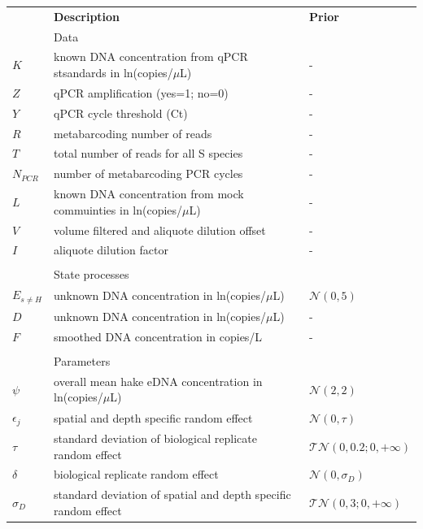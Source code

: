 \documentclass{article}
\begin{document}
\begin{table}[h]
    \centering
    \begin{tabular}{lll}
         & \textbf{Description} & \textbf{Prior} \\
&Data & \\
\hline
$K$ & known DNA concentration from qPCR stsandards in ln(copies/$\mu$L) & - \\
$Z$ & qPCR amplification (yes=1; no=0) & - \\
$Y$ & qPCR cycle threshold (Ct) & - \\
$R$ & metabarcoding number of reads & - \\
$T$ & total number of reads for all S species & - \\
$N_{PCR}$ & number of metabarcoding PCR cycles & - \\
$L$ & known DNA concentration from mock commuinties in ln(copies/$\mu$L) & - \\
$V$ & volume filtered and aliquote dilution offset & -\\
$I$ & aliquote dilution factor & -\\

&&\\
&State processes&\\
\hline
$E_{s\neq H}$ & unknown DNA concentration in ln(copies/$\mu$L) & $\mathcal{N}(0,5)$\\
$D$ & unknown DNA concentration in ln(copies/$\mu$L)& - \\
$F$ & smoothed DNA concentration in copies/L & - \\
&&\\

&Parameters&\\
\hline
$\psi$& overall mean hake eDNA concentration in ln(copies/$\mu$L) & $\mathcal{N}(2,2)$\\
$\epsilon_{j}$& spatial and depth specific random effect & $\mathcal{N}(0,\tau)$\\
$\tau$& standard deviation of biological replicate random effect & $\mathcal{TN}(0,0.2;0, +\infty)$\\

$\delta$& biological replicate random effect & $\mathcal{N}(0,\sigma_D)$\\
$\sigma_D $& standard deviation of spatial and depth specific random effect & $\mathcal{TN}(0,3;0, +\infty)$\\


\end{tabular}
\end{table}
\end{document}
